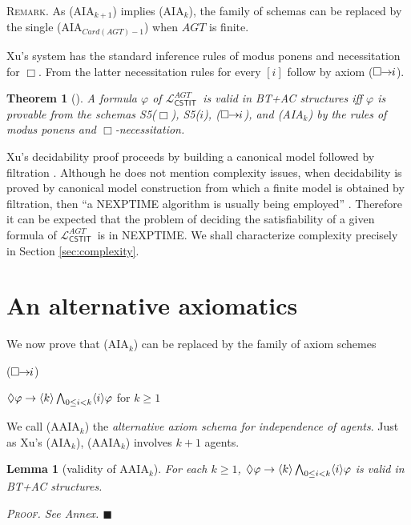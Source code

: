 \documentclass{article}
\newtheorem{theorem}{Theorem}
\newtheorem{lemma}{Lemma}
\newenvironment{remark}{\medskip\noindent \textsc{Remark.}} {\medskip}
\newenvironment{pf}{\em \medskip\noindent \textsc{Proof.}}
{\hspace*{\fill}\nolinebreak[2]\hspace*{\fill}$\blacksquare$\medskip}
\renewcommand{\phi}{\varphi}
\newcommand{\card}[1]{\mathit{Card}(#1)}           \newcommand{\ext}[1]{|#1|}
\newcommand{\cstit}[1]{[{#1}]}           \newcommand{\poscstit}[1]{\langle {#1} \rangle}    \newcommand{\dstit}[2]{[{#1}\ \mathit{dstit}\! :{#2}]}
\newcommand{\InclBox}[1]{$\Box \!\! \imp \!\! #1$}
\newcommand{\agtset}{\ensuremath{\mathit{AGT}}}
\newcommand{\LCSTIT}{$\mathcal{L}_{\mathsf{CSTIT}}^\agtset$}
\begin{document}
\begin{remark}
As (AIA$_{k+1}$) implies (AIA$_k$), the family of schemas can be replaced by
the single (AIA$_{\card{\agtset}-1}$) when $\agtset$ is finite.
\end{remark}



Xu's system has the standard inference rules of modus ponens and
necessitation for $\Box$. From the latter necessitation rules for
every $\cstit{i}$ follow by axiom (\InclBox{i}).

\begin{theorem}[\mbox{\cite[Chapter 17]{belnap01facing}}]\label{XuCompleteness}
A formula $\phi$ of \LCSTIT\ is valid in BT+AC structures iff $\phi$ is provable from
the schemas S5($\Box$), S5($i$), (\InclBox{i}), and (AIA$_k$) by the rules of
modus ponens and $\Box$-necessitation.
\end{theorem}


Xu's decidability proof proceeds by building a canonical model
followed by filtration \cite[Theorems 17-18]{belnap01facing}.
Although he does not mention complexity issues,
when decidability is proved by canonical model construction
from which a finite model is obtained by filtration, then
``a NEXPTIME algorithm is usually being employed''
\cite[Appendix C, p.\ 515]{Blackburn:2001:ML}.
Therefore it can be expected that the problem of deciding
the satisfiability of a given formula of \LCSTIT\
is in NEXPTIME.
We shall characterize complexity precisely in Section \ref{sec:complexity}.





\goodbreak
\section{An alternative axiomatics }\label{sec:alterAx}


We now prove that (AIA$_k$) can be replaced by the family of axiom schemes
\begin{itemlist}{(\InclBox{i})}
  \item[(AAIA$_k$)]
  $ \Diamond \phi \imp
    \poscstit{k} \bigwedge_{0 \leq i < k} \poscstit{i} \phi  $   \hfill for $k \geq 1$
\end{itemlist}
We call (AAIA$_k$) the \emph{alternative axiom schema for independence of agents}.
Just as Xu's (AIA$_k$), (AAIA$_k$) involves $k+1$ agents.

\begin{lemma}[validity of AAIA$_k$]\label{lem:validAaia}
For each $k \geq 1$,
$\Diamond\phi \imp \poscstit{k} \bigwedge_{0 \leq i < k} \poscstit{i}\phi$
is valid in BT+AC structures.


\begin{pf}
See Annex.
\end{pf}
\end{lemma}
\end{document}
